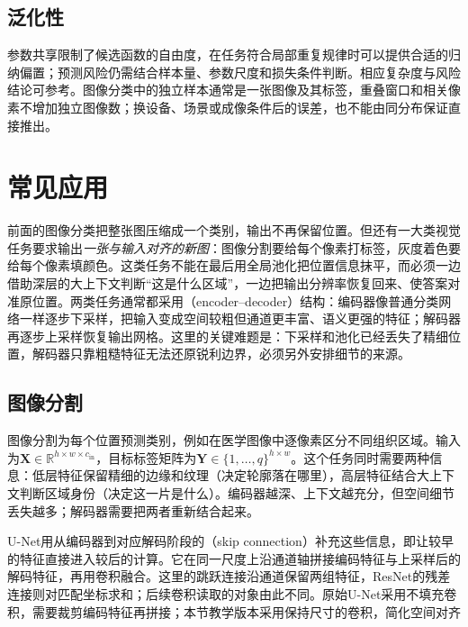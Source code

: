 \subsection{泛化性}
\label{sec:cnn-generalization}

参数共享限制了候选函数的自由度，在任务符合局部重复规律时可以提供合适的归纳偏置；预测风险仍需结合样本量、参数尺度和损失条件判断。相应复杂度与风险结论可参考。图像分类中的独立样本通常是一张图像及其标签，重叠窗口和相关像素不增加独立图像数；换设备、场景或成像条件后的误差，也不能由同分布保证直接推出。

\section{常见应用}
\label{sec:cnn-applications}

前面的图像分类把整张图压缩成一个类别，输出不再保留位置。但还有一大类视觉任务要求输出\emph{一张与输入对齐的新图}：图像分割要给每个像素打标签，灰度着色要给每个像素填颜色。这类任务不能在最后用全局池化把位置信息抹平，而必须一边借助深层的大上下文判断“这是什么区域”，一边把输出分辨率恢复回来、使答案对准原位置。两类任务通常都采用（encoder--decoder）结构：编码器像普通分类网络一样逐步下采样，把输入变成空间较粗但通道更丰富、语义更强的特征；解码器再逐步上采样恢复输出网格。这里的关键难题是：下采样和池化已经丢失了精细位置，解码器只靠粗糙特征无法还原锐利边界，必须另外安排细节的来源。

\subsection{图像分割}
\label{sec:cnn-segmentation}

图像分割为每个位置预测类别，例如在医学图像中逐像素区分不同组织区域。输入为$\bm X\in\mathbb R^{h\times w\times c_{\mathrm{in}}}$，目标标签矩阵为$\bm Y\in\{1,\ldots,q\}^{h\times w}$。这个任务同时需要两种信息：低层特征保留精细的边缘和纹理（决定轮廓落在哪里），高层特征结合大上下文判断区域身份（决定这一片是什么）。编码器越深、上下文越充分，但空间细节丢失越多；解码器需要把两者重新结合起来。

U-Net用从编码器到对应解码阶段的（skip connection）补充这些信息，即让较早的特征直接进入较后的计算。它在同一尺度上沿通道轴拼接编码特征与上采样后的解码特征，再用卷积融合。这里的跳跃连接沿通道保留两组特征，ResNet的残差连接则对匹配坐标求和；后续卷积读取的对象由此不同。原始U-Net采用不填充卷积，需要裁剪编码特征再拼接；本节教学版本采用保持尺寸的卷积，简化空间对齐

